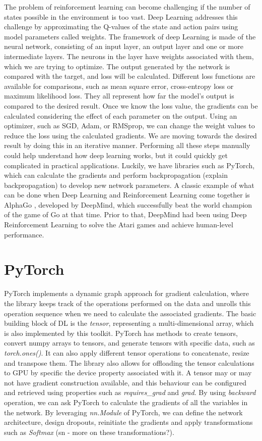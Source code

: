 \documentclass[logo,msc]{infthesis}           %
\begin{document}
The problem of reinforcement learning can become challenging if the number of states possible in the environment is too vast. Deep Learning addresses this challenge by approximating the Q-values of the state and action pairs using model parameters called weights. The framework of deep Learning is made of the neural network, consisting of an input layer, an output layer and one or more intermediate layers. The neurons in the layer have weights associated with them, which we are trying to optimize. The output generated by the network is compared with the target, and loss will be calculated. Different loss functions are available for comparisons, such as mean square error, cross-entropy loss or maximum likelihood loss. They all represent how far the model's output is compared to the desired result. Once we know the loss value, the gradients can be calculated considering the effect of each parameter on the output. Using an optimizer, such as SGD, Adam, or RMSprop, we can change the weight values to reduce the loss using the calculated gradients. We are moving towards the desired result by doing this in an iterative manner. Performing all these steps manually could help understand how deep learning works, but it could quickly get complicated in practical applications. Luckily, we have libraries such as PyTorch, which can calculate the gradients and perform backpropagation (explain backpropagation) to develop new network parameters. A classic example of what can be done when Deep Learning and Reinforcement Learning come together is AlphaGo \cite{AlphaGo}, developed by DeepMind, which successfully beat the world champion of the game of Go at that time. Prior to that, DeepMind had been using Deep Reinforcement Learning to solve the Atari games and achieve human-level performance\cite {DeepMind}.

\section{PyTorch}

PyTorch implements a dynamic graph approach for gradient calculation, where the library keeps track of the operations performed on the data and unrolls this operation sequence when we need to calculate the associated gradients. The basic building block of DL is the \textit{tensor}, representing a multi-dimensional array, which is also implemented by this toolkit. PyTorch has methods to create tensors, convert numpy arrays to tensors, and generate tensors with specific data, such as \textit{torch.ones()}. It can also apply different tensor operations to concatenate, resize and transpose them. The library also allows for offloading the tensor calculations to GPU by specific the \textit{}device property associated with it. A tensor may or may not have gradient construction available, and this behaviour can be configured and retrieved using properties such as \textit{requires\_grad} and \textit{grad}. By using \textit{backward} operation, we can ask PyTorch to calculate the gradients of all the variables in the network. By leveraging \textit{nn.Module} of PyTorch, we can define the network architecture, design dropouts, reinitiate the gradients and apply transformations such as \textit{Softmax} (sn - more on these transformations?).
\end{document}
